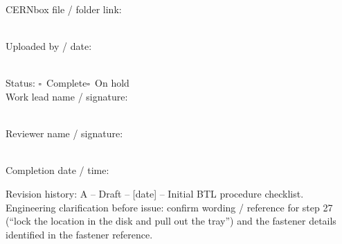 \documentclass[10pt,a4paper]{article}
\newcommand{\cb}{\(\square\)}
\newcommand{\linefield}{\rule{0pt}{6mm}\hrulefill}
\begin{document}
CERNbox file / folder link: \linefield\\[2mm]
Uploaded by / date: \linefield\\[3mm]
Status: \cb\ Complete\quad\cb\ On hold\\[3mm]
Work lead name / signature: \linefield\\[3mm]
Reviewer name / signature: \linefield\\[3mm]
Completion date / time: \linefield
\vspace{2mm}
\footnotesize Revision history: A -- Draft -- [date] -- Initial BTL procedure checklist.\\
Engineering clarification before issue: confirm wording / reference for step 27 (``lock the location in the disk and pull out the tray'') and the fastener details identified in the fastener reference.
\end{document}
